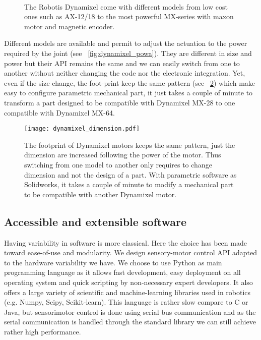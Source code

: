 \begin{figure}[!h]
\centering
    \hfil
    \\
    \caption{The Robotis Dynamixel come with different models from low cost ones such as AX-12/18 to the most powerful MX-series with maxon motor and magnetic encoder.}
    \label{fig:dynamixel_serie}
\end{figure}

Different models are available and permit to adjust the actuation to the power required by the joint (see \figurename~\ref{fig:dynamixel_powa}). They are different in size and power but their API remains the same and we can easily switch from one to another without neither changing the code nor the electronic integration. Yet, even if the size change, the foot-print keep the same pattern (see \figurename~\ref{fig:dynamixel_dimension}) which make easy to configure parametric mechanical part, it just takes a couple of minute to transform a part designed to be compatible with Dynamixel MX-28 to one compatible with Dynamixel MX-64.


\begin{figure}[tb]
    \begin{center}
        \texttt{[image: dynamixel\_dimension.pdf]}
    \end{center}
    \caption{The footprint of Dynamixel motors keeps the same pattern, just the dimension are increased following the power of the motor. Thus switching from one model to another only requires to change dimension and not the design of a part. With parametric software as Solidworks, it takes a couple of minute to modify a mechanical part to be compatible with another Dynamixel motor.}
    \label{fig:dynamixel_dimension}
\end{figure}


\subsection{Accessible and extensible software} %

Having variability in software is more classical. Here the choice has been made toward ease-of-use and modularity. We design sensory-motor control API adapted to the hardware variability we have. We choose to use Python as main programming language as it allows fast development, easy deployment on all operating system and quick scripting by non-necessary expert developers. It also offers a large variety of scientific and machine-learning libraries used in robotics (e.g. Numpy, Scipy, Scikit-learn).
This language is rather slow compare to C or Java, but sensorimotor control is done using serial bus communication and as the serial communication is handled through the standard library we can still achieve rather high performance.


